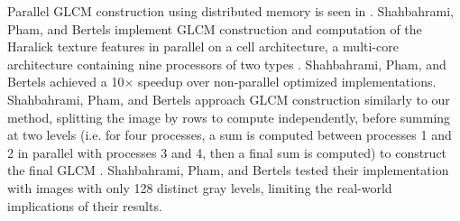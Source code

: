 \documentclass{article}
\begin{document}
   Parallel GLCM construction using distributed memory is seen in \cite{shahbahrami}. Shahbahrami, Pham, and Bertels implement GLCM construction and computation of the Haralick texture features in parallel on a cell architecture, a multi-core architecture containing nine processors of two types \cite{shahbahrami}.  Shahbahrami, Pham, and Bertels achieved a 10$\times$ speedup over non-parallel optimized implementations. Shahbahrami, Pham, and Bertels approach GLCM construction similarly to our method, splitting the image by rows to compute independently, before summing at two levels (i.e. for four processes, a sum is computed between processes 1 and 2 in parallel with processes 3 and 4, then a final sum is computed) to construct the final GLCM \cite{shahbahrami}. Shahbahrami, Pham, and Bertels tested their implementation with images with only 128 distinct gray levels, limiting the real-world implications of their results. 
\end{document}
